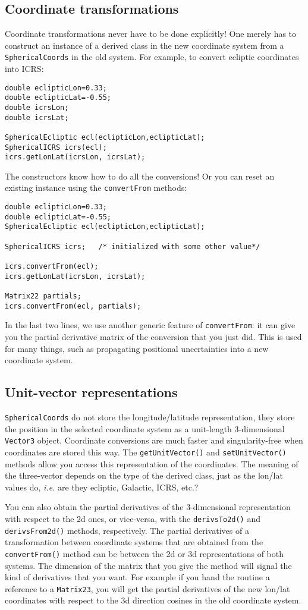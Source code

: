 \documentclass[11pt,preprint,flushrt]{aastex}
\begin{document}
\subsection{Coordinate transformations}
Coordinate transformations never have to be done explicitly! One merely has to construct an instance of a derived class in the new coordinate system from a {\tt SphericalCoords} in the old system.  For example, to convert ecliptic coordinates into ICRS:
\begin{verbatim}
double eclipticLon=0.33;
double eclipticLat=-0.55;
double icrsLon;
double icrsLat;

SphericalEcliptic ecl(eclipticLon,eclipticLat);
SphericalICRS icrs(ecl);
icrs.getLonLat(icrsLon, icrsLat);
\end{verbatim}
The constructors know how to do all the conversions!  Or you can reset an existing instance using the {\tt convertFrom} methods:
\begin{verbatim}
double eclipticLon=0.33;
double eclipticLat=-0.55;
SphericalEcliptic ecl(eclipticLon,eclipticLat);

SphericalICRS icrs;   /* initialized with some other value*/

icrs.convertFrom(ecl);
icrs.getLonLat(icrsLon, icrsLat);

Matrix22 partials;
icrs.convertFrom(ecl, partials);
\end{verbatim}
In the last two lines, we use another generic feature of {\tt convertFrom}: it can give you the partial derivative matrix of the conversion that you just did.  This is used for many things, such as propagating positional uncertainties into a new coordinate system.

\subsection{Unit-vector representations}
{\tt SphericalCoords} do not store the longitude/latitude representation, they store the position in the selected coordinate system as a unit-length 3-dimensional {\tt Vector3} object.  Coordinate conversions are much faster and singularity-free when coordinates are stored this way.  The {\tt getUnitVector()} and {\tt setUnitVector()} methods allow you access this representation of the coordinates.  The meaning of the three-vector depends on the type of the derived class, just as the lon/lat values do, {\it i.e.} are they ecliptic, Galactic, ICRS, etc.?

You can also obtain the partial derivatives of the 3-dimensional representation with respect to the 2d ones, or vice-versa, with the {\tt derivsTo2d()} and {\tt derivsFrom2d()} methods, respectively.  The partial derivatives of a transformation between coordinate systems that are obtained from the {\tt convertFrom()} method can be between the 2d or 3d representations of both systems.  The dimension of the matrix that you give the method will signal the kind of derivatives that you want.  For example if you hand the routine a reference to a {\tt Matrix23}, you will get the partial derivatives of the new lon/lat coordinates with respect to the 3d direction cosines in the old coordinate system.
\end{document}
